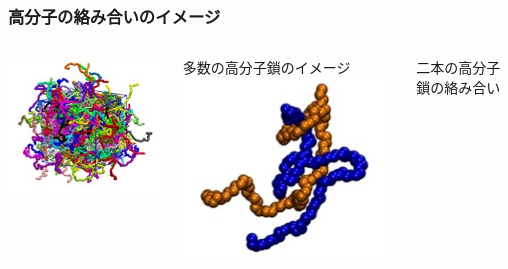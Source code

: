 \documentclass[unicode,12pt]{beamer}%
\begin{document}
\begin{frame}
	\frametitle{高分子の絡み合いのイメージ}
	\begin{columns}[c, onlytextwidth]
		\centering
		\includegraphics[width=\textwidth]{polymer_image2.png}

		多数の高分子鎖のイメージ
		\centering
		\includegraphics[width=\textwidth]{karamiai.png}

		二本の高分子鎖の絡み合い
	\end{columns}
\end{frame}
\end{document}
